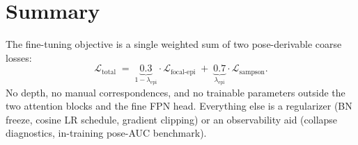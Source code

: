 \documentclass[11pt]{article}
\begin{document}
\section{Summary}

The fine-tuning objective is a single weighted sum of two
pose-derivable coarse losses:
\[
\mathcal{L}_{\text{total}}
\;=\;
\underbrace{0.3}_{1 - \lambda_{\text{epi}}} \cdot \mathcal{L}_{\text{focal-epi}}
\;+\;
\underbrace{0.7}_{\lambda_{\text{epi}}} \cdot \mathcal{L}_{\text{sampson}}.
\]
No depth, no manual correspondences, and no trainable parameters
outside the two attention blocks and the fine FPN head. Everything else
is a regularizer (BN freeze, cosine LR schedule, gradient clipping) or
an observability aid (collapse diagnostics, in-training pose-AUC
benchmark).
\end{document}
